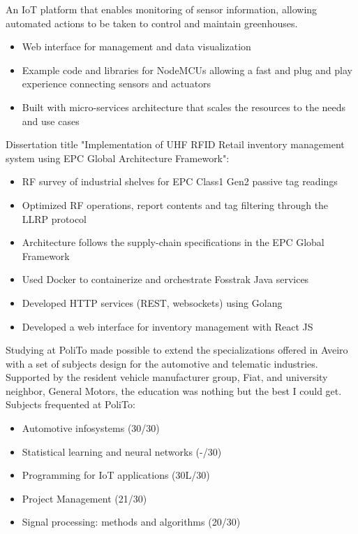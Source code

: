 \documentclass[10pt,a4paper,ragged2e,withhyper]{altacv}
\begin{document}
\begin{paracol}{2}

An IoT platform that enables monitoring of sensor information, allowing automated actions to be taken to control and maintain greenhouses. 
\begin{itemize}
\item Web interface for management and data visualization
\item Example code and libraries for NodeMCUs allowing a fast and plug and play experience connecting sensors and actuators
\item Built with micro-services architecture that scales the resources to the needs and use cases
\end{itemize}

\medskip





Dissertation title "Implementation of UHF RFID Retail inventory management system using EPC Global Architecture Framework":
\begin{itemize}
  \item RF survey of industrial shelves for EPC Class1 Gen2 passive tag readings
  \item Optimized RF operations, report contents and tag filtering through the LLRP protocol
  \item Architecture follows the supply-chain specifications in the EPC Global Framework
  \item Used Docker to containerize and orchestrate Fosstrak Java services
  \item Developed HTTP services (REST, websockets) using Golang
  \item Developed a web interface for inventory management with React JS
\end{itemize} 

\divider


Studying at PoliTo made possible to extend the specializations offered in Aveiro with a set of subjects design for the automotive and telematic industries. Supported by the resident vehicle manufacturer group, Fiat, and university neighbor, General Motors, the education was nothing but the best I could get.
Subjects frequented at PoliTo:
\begin{itemize}
  \item Automotive infosystems (30/30)
  \item Statistical learning and neural networks (-/30)
  \item Programming for IoT applications (30L/30)
  \item Project Management (21/30)
  \item Signal processing: methods and algorithms (20/30)
\end{itemize}


\end{paracol}
\end{document}
